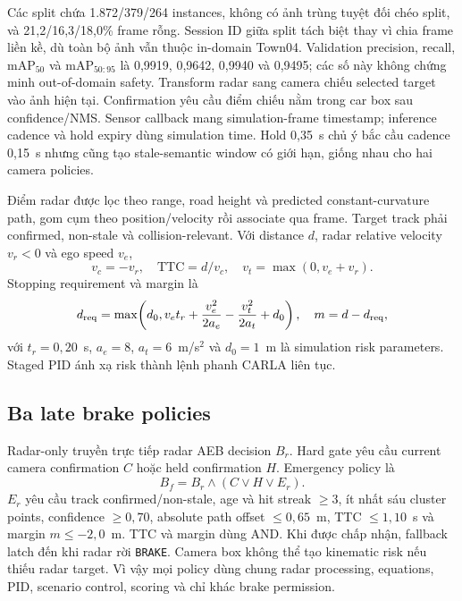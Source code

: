 \documentclass[conference]{IEEEtran}
\begin{document}
Các split chứa 1.872/379/264 instances, không có ảnh trùng tuyệt đối chéo split,
và 21,2/16,3/18,0\% frame rỗng. Session ID giữa split tách biệt thay vì chia
frame liền kề, dù toàn bộ ảnh vẫn thuộc in-domain Town04. Validation precision,
recall, $\mathrm{mAP}_{50}$ và $\mathrm{mAP}_{50:95}$ là 0,9919, 0,9642, 0,9940
và 0,9495; các số này không chứng minh out-of-domain safety. Transform radar sang
camera chiếu selected target vào ảnh hiện tại. Confirmation yêu cầu điểm chiếu
nằm trong car box sau confidence/NMS. Sensor callback mang simulation-frame
timestamp; inference cadence và hold expiry dùng simulation time. Hold 0,35~s
chủ ý bắc cầu cadence 0,15~s nhưng cũng tạo stale-semantic window có giới hạn,
giống nhau cho hai camera policies.

Điểm radar được lọc theo range, road height và predicted constant-curvature path,
gom cụm theo position/velocity rồi associate qua frame. Target track phải
confirmed, non-stale và collision-relevant. Với distance $d$, radar relative
velocity $v_r<0$ và ego speed $v_e$,
\begin{equation}
 v_c=-v_r,\quad \mathrm{TTC}=d/v_c,\quad v_t=\max(0,v_e+v_r).
\end{equation}
Stopping requirement và margin là
\begin{equation}
 d_{\rm req}=\max\!\left(d_0,v_et_r+\frac{v_e^2}{2a_e}-
 \frac{v_t^2}{2a_t}+d_0\right),\quad m=d-d_{\rm req},
\end{equation}
với $t_r=0,20$~s, $a_e=8$, $a_t=6$~m/s$^2$ và $d_0=1$~m là simulation risk
parameters. Staged PID ánh xạ risk thành lệnh phanh CARLA liên tục.

\subsection{Ba late brake policies}
Radar-only truyền trực tiếp radar AEB decision $B_r$. Hard gate yêu cầu current
camera confirmation $C$ hoặc held confirmation $H$. Emergency policy là
\begin{equation}
 B_f=B_r\land(C\lor H\lor E_r).
\end{equation}
$E_r$ yêu cầu track confirmed/non-stale, age và hit streak $\geq3$, ít nhất sáu
cluster points, confidence $\geq0,70$, absolute path offset $\leq0,65$~m, TTC
$\leq1,10$~s và margin $m\leq-2,0$~m. TTC và margin dùng AND. Khi được chấp nhận,
fallback latch đến khi radar rời \texttt{BRAKE}. Camera box không thể tạo
kinematic risk nếu thiếu radar target. Vì vậy mọi policy dùng chung radar
processing, equations, PID, scenario control, scoring và chỉ khác brake permission.
\end{document}

